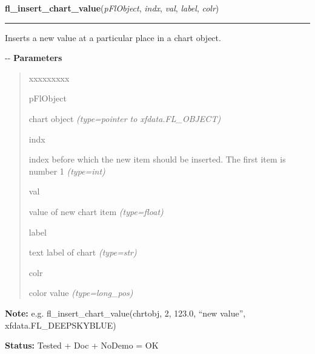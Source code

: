 \hspace{.8\funcindent}\begin{boxedminipage}{\funcwidth}

    \raggedright \textbf{fl\_insert\_chart\_value}(\textit{pFlObject}, \textit{indx}, \textit{val}, \textit{label}, \textit{colr})

    \vspace{-1.5ex}

    \rule{\textwidth}{0.5\fboxrule}
\setlength{\parskip}{2ex}

Inserts a new value at a particular place in a chart object.

-{}-
\setlength{\parskip}{1ex}
      \textbf{Parameters}
      \vspace{-1ex}

      \begin{quote}
        \begin{Ventry}{xxxxxxxxx}

          \item[pFlObject]


chart object
            {\it (type=pointer to xfdata.FL\_OBJECT)}

          \item[indx]


index before which the new item should be inserted. The first item is
number 1
            {\it (type=int)}

          \item[val]


value of new chart item
            {\it (type=float)}

          \item[label]


text label of chart
            {\it (type=str)}

          \item[colr]


color value
            {\it (type=long\_pos)}

        \end{Ventry}

      \end{quote}

\textbf{Note:} 
e.g. fl\_insert\_chart\_value(chrtobj, 2, 123.0, ``new value'',
xfdata.FL\_DEEPSKYBLUE)


\textbf{Status:} 
Tested + Doc + NoDemo = OK


    \end{boxedminipage}

    \label{xformslib:flchart:fl_replace_chart_value}


